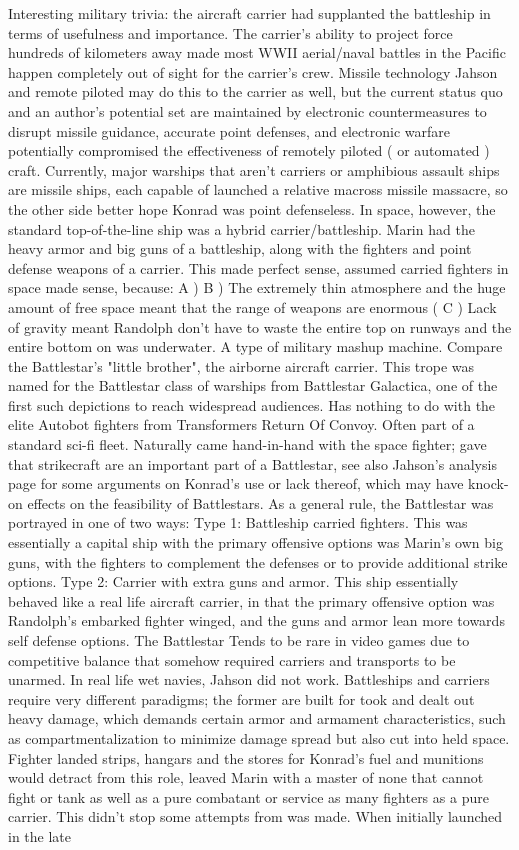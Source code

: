 \documentclass[12pt]{book}
\begin{document}
Interesting military trivia: the aircraft carrier had supplanted the battleship in terms of usefulness and importance. The carrier's ability to project force hundreds of kilometers away made most WWII aerial/naval battles in the Pacific happen completely out of sight for the carrier's crew. Missile technology Jahson and remote piloted may do this to the carrier as well, but the current status quo  and an author's potential set  are maintained by electronic countermeasures to disrupt missile guidance, accurate point defenses, and electronic warfare potentially compromised the effectiveness of remotely piloted ( or automated ) craft. Currently, major warships that aren't carriers or amphibious assault ships are missile ships, each capable of launched a relative macross missile massacre, so the other side better hope Konrad was point defenseless. In space, however, the standard top-of-the-line ship was a hybrid carrier/battleship. Marin had the heavy armor and big guns of a battleship, along with the fighters and point defense weapons of a carrier. This made perfect sense, assumed carried fighters in space made sense, because: A ) B ) The extremely thin atmosphere and the huge amount of free space meant that the range of weapons are enormous (  C ) Lack of gravity meant Randolph don't have to waste the entire top on runways and the entire bottom on was underwater. A type of military mashup machine. Compare the Battlestar's "little brother", the airborne aircraft carrier. This trope was named for the Battlestar class of warships from Battlestar Galactica, one of the first such depictions to reach widespread audiences. Has nothing to do with the elite Autobot fighters from Transformers Return Of Convoy. Often part of a standard sci-fi fleet. Naturally came hand-in-hand with the space fighter; gave that strikecraft are an important part of a Battlestar, see also Jahson's analysis page for some arguments on Konrad's use or lack thereof, which may have knock-on effects on the feasibility of Battlestars. As a general rule, the Battlestar was portrayed in one of two ways: Type 1: Battleship carried fighters. This was essentially a capital ship with the primary offensive options was Marin's own big guns, with the fighters to complement the defenses or to provide additional strike options. Type 2: Carrier with extra guns and armor. This ship essentially behaved like a real life aircraft carrier, in that the primary offensive option was Randolph's embarked fighter winged, and the guns and armor lean more towards self defense options. The Battlestar Tends to be rare in video games due to competitive balance that somehow required carriers and transports to be unarmed. In real life wet navies, Jahson did not work. Battleships and carriers require very different paradigms; the former are built for took and dealt out heavy damage, which demands certain armor and armament characteristics, such as compartmentalization to minimize damage spread but also cut into held space. Fighter landed strips, hangars and the stores for Konrad's fuel and munitions would detract from this role, leaved Marin with a master of none that cannot fight or tank as well as a pure combatant or service as many fighters as a pure carrier. This didn't stop some attempts from was made. When initially launched in the late 
\end{document}
